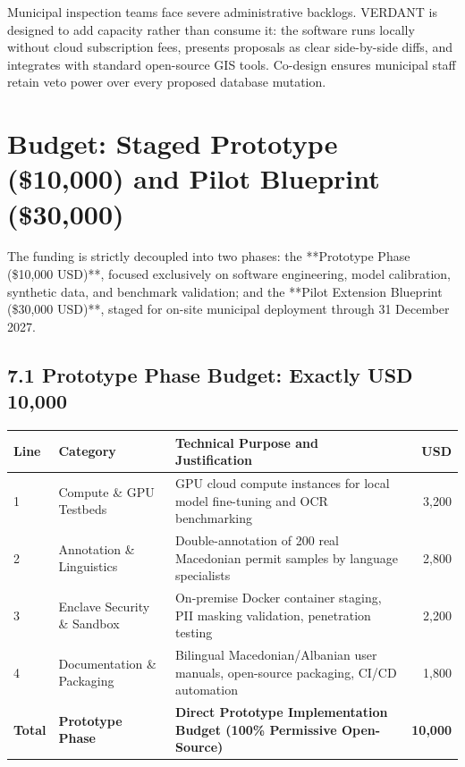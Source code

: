 \documentclass[9pt,a4paper]{article}
\begin{document}
\vspace{0.15em}
Municipal inspection teams face severe administrative backlogs. VERDANT is designed to add capacity rather than consume it: the software runs locally without cloud subscription fees, presents proposals as clear side-by-side diffs, and integrates with standard open-source GIS tools. Co-design ensures municipal staff retain veto power over every proposed database mutation.

\vspace{0.15em}
\section{Budget: Staged Prototype (\$10,000) and Pilot Blueprint (\$30,000)}
The funding is strictly decoupled into two phases: the **Prototype Phase (\$10,000 USD)**, focused exclusively on software engineering, model calibration, synthetic data, and benchmark validation; and the **Pilot Extension Blueprint (\$30,000 USD)**, staged for on-site municipal deployment through 31 December 2027.

\vspace{0.1em}
\subsection*{7.1 Prototype Phase Budget: Exactly USD 10,000}
\renewcommand{\arraystretch}{0.91}
\begin{tabularx}{\textwidth}{@{}llXr@{}}
\toprule
\textsf{\textbf{\fontsize{8pt}{10pt}\selectfont Line}} & \textsf{\textbf{\fontsize{8pt}{10pt}\selectfont Category}} & \textsf{\textbf{\fontsize{8pt}{10pt}\selectfont Technical Purpose and Justification}} & \textsf{\textbf{\fontsize{8pt}{10pt}\selectfont USD}} \\
\midrule
1 & Compute \& GPU Testbeds & GPU cloud compute instances for local model fine-tuning and OCR benchmarking & 3,200 \\
2 & Annotation \& Linguistics & Double-annotation of 200 real Macedonian permit samples by language specialists & 2,800 \\
3 & Enclave Security \& Sandbox & On-premise Docker container staging, PII masking validation, penetration testing & 2,200 \\
4 & Documentation \& Packaging & Bilingual Macedonian/Albanian user manuals, open-source packaging, CI/CD automation & 1,800 \\
\midrule
\textbf{Total} & \textbf{Prototype Phase} & \textbf{Direct Prototype Implementation Budget (100\% Permissive Open-Source)} & \textbf{10,000} \\
\bottomrule
\end{tabularx}
\end{document}
